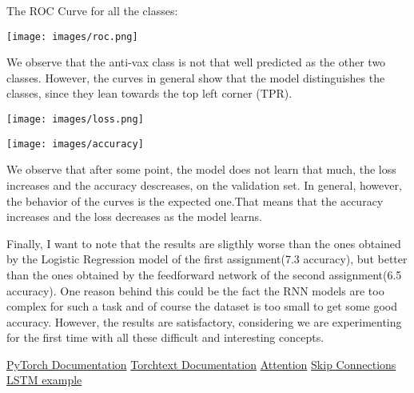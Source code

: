 \documentclass{article}
\begin{document}
The ROC Curve for all the classes:
\begin{center}
\texttt{[image: images/roc.png]}
\end{center}
We observe that the anti-vax class is not that well predicted as the other two classes.
However, the curves in general show that the model distinguishes the classes, since they lean towards the top left corner (TPR).
\begin{center}
\texttt{[image: images/loss.png]}
\end{center}
\begin{center}
\texttt{[image: images/accuracy]}
\end{center}
We observe that after some point, the model does not learn that much, the loss increases and the accuracy descreases, on the validation set.
In general, however, the behavior of the curves is the expected one.That means that the accuracy increases and the loss decreases as the model learns.

Finally, I want to note that the results are sligthly worse than the ones obtained by the Logistic Regression model of the first assignment(7.3 accuracy), but better than the ones obtained by the feedforward network of the second assignment(6.5 accuracy). One reason behind this could be the fact the RNN models are too complex for such a task and of course the dataset is too small to get some good accuracy. However, the results are satisfactory, considering we are experimenting for the first time with all these difficult and interesting concepts.
\begin{thebibliography}{9}
\bibitem{}
\href{https://pytorch.org/docs/stable/nn.html#non-linear-activations-other}{PyTorch Documentation} 
\bibitem{}
\href{https://torchtext.readthedocs.io/en/latest/index.html}{Torchtext Documentation}
\bibitem{}
\href{https://medium.com/intel-student-ambassadors/implementing-attention-models-in-pytorch-f947034b3e66}{Attention}
\bibitem{}
\href{https://www.analyticsvidhya.com/blog/2021/08/all-you-need-to-know-about-skip-connections/}{Skip Connections}
\bibitem{}
\href{https://towardsdatascience.com/lstm-text-classification-using-pytorch-2c6c657f8fc0}{LSTM example}
\end{thebibliography}
\end{document}
